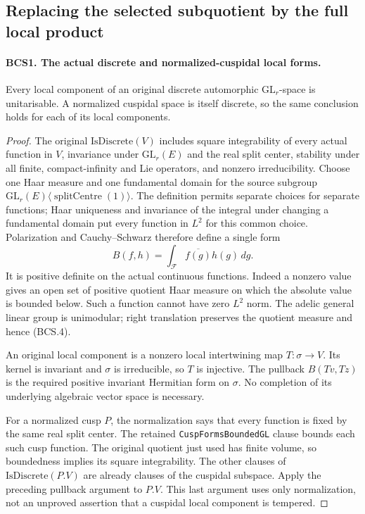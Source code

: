 \documentclass[11pt,a4paper]{article}
\numberwithin{equation}{section}
\theoremstyle{remark}\newtheorem{remark}[theorem]{Remark}
\begin{document}
\subsection{Replacing the selected subquotient by the full local product}

\paragraph{BCS1. The actual discrete and normalized-cuspidal local forms.}
\label{claim:BCS1}
Every local component of an original discrete automorphic
\(\mathrm{GL}_r\)-space is unitarisable.  A normalized cuspidal
space is itself discrete, so the same conclusion holds for each of
its local components.
\begin{proof}
The original \(\mathrm{IsDiscrete}(V)\) includes square
integrability of every actual function in \(V\), invariance under
\(\mathrm{GL}_r(E)\) and the real split center, stability under all
finite, compact-infinity and Lie operators, and nonzero irreducibility.
Choose one Haar measure and one fundamental domain for the source
subgroup
\(\mathrm{GL}_r(E)\langle\operatorname{splitCentre}(1)\rangle\).
The definition permits separate choices for separate functions; Haar
uniqueness and invariance of the integral under changing a fundamental
domain put every function in \(L^2\) for this common choice.  Polarization
and Cauchy--Schwarz therefore define a single form
\[
 B(f,h)=\int_{\mathcal F}\overline{f(g)}h(g)\,dg.
 \tag{BCS.4}
\]
It is positive definite on the actual continuous functions.  Indeed a
nonzero value gives an open set of positive quotient Haar measure on
which the absolute value is bounded below.  Such a function cannot have
zero \(L^2\) norm.  The adelic general linear group is unimodular;
right translation preserves the quotient measure and hence (BCS.4).

An original local component is a nonzero local intertwining map
\(T:\sigma\to V\).  Its kernel is invariant and \(\sigma\) is
irreducible, so \(T\) is injective.  The pullback \(B(Tv,Tz)\) is
the required positive invariant Hermitian form on \(\sigma\).
No completion of its underlying algebraic vector space is necessary.

For a normalized cusp \(P\), the normalization says that every
function is fixed by the same real split center.  The retained
\texttt{Cusp\allowbreak Forms\allowbreak Bounded\allowbreak GL} clause bounds each such cusp function.
The original quotient just used has finite volume, so boundedness
implies its square integrability.  The other clauses of
\(\mathrm{IsDiscrete}(P.V)\) are already clauses of the cuspidal
subspace.  Apply the preceding pullback argument to \(P.V\).
This last argument uses only normalization, not an unproved assertion
that a cuspidal local component is tempered.
\end{proof}
\end{document}
